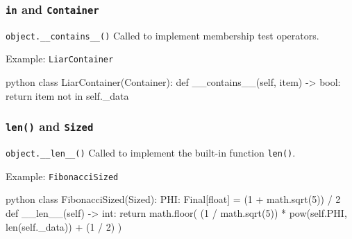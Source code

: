 \documentclass[aspectratio=169,dvipdfmx,12pt,notheorems]{beamer}
\theoremstyle{definition}
\begin{document}
%

\begin{frame}[fragile]\frametitle{\texttt{in} and \texttt{Container}}

\begin{block}{\texttt{object.\_\_contains\_\_()}}
Called to implement membership test operators.
\end{block}

\begin{exampleblock}{Example: \texttt{LiarContainer}}
\begin{pygments}{python}
class LiarContainer(Container):
    def __contains__(self, item) -> bool:
        return item not in self._data
\end{pygments}
\end{exampleblock}

\end{frame}

\begin{frame}[fragile]\frametitle{\texttt{len()} and \texttt{Sized}}

\begin{block}{\texttt{object.\_\_len\_\_()}}
Called to implement the built-in function \texttt{len()}.
\end{block}

\begin{exampleblock}{Example: \texttt{FibonacciSized}}
\begin{pygments}{python}
class FibonacciSized(Sized):
    PHI: Final[float] = (1 + math.sqrt(5)) / 2
    def __len__(self) -> int:
        return math.floor(
            (1 / math.sqrt(5)) * pow(self.PHI, len(self._data))
            + (1 / 2)
        )
\end{pygments}
\end{exampleblock}

\end{frame}
\end{document}
